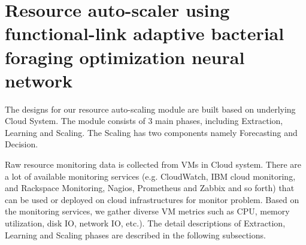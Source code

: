 \documentclass[runningheads]{llncs}
\begin{document}


\section{Resource auto-scaler using functional-link adaptive bacterial foraging optimization neural network}
\label{fl_bfonn}

\label{designing_system}

The designs for our resource auto-scaling module are built based on underlying Cloud System. The module consists of 3 main phases, including Extraction, Learning and Scaling. The Scaling has two components namely Forecasting and Decision.


Raw resource monitoring data is collected from VMs in Cloud system. There are a lot of available monitoring services (e.g. CloudWatch, IBM cloud monitoring, and Rackspace Monitoring, Nagios, Prometheus and Zabbix and so forth) that can be used or deployed on cloud infrastructures for monitor problem. Based on the monitoring services, we gather diverse VM metrics such as CPU, memory utilization, disk IO, network IO, etc.). The detail descriptions of Extraction, Learning and Scaling phases are described in the following subsections. 
\end{document}
